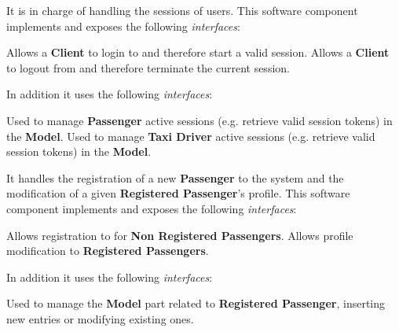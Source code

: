\begin{itemize}
\begin{itemize}
		It is in charge of handling the sessions of \myTaxiService{} users.
		This software component implements and exposes the following \textit{interfaces}:
		\begin{itemize}
			 Allows a \textbf{Client} to login to \myTaxiService{} and therefore start a valid session.
			 Allows a \textbf{Client} to logout from \myTaxiService{} and therefore terminate the current session.
		\end{itemize}
		In addition it uses the following \textit{interfaces}:
		\begin{itemize}
			 Used to manage \textbf{Passenger} active sessions (e.g. retrieve valid session tokens) in the \textbf{Model}.
			 Used to manage \textbf{Taxi Driver} active sessions (e.g. retrieve valid session tokens) in the \textbf{Model}.
		\end{itemize}
		
		\itemBold{Profile Manager}
		It handles the registration of a new \textbf{Passenger} to the system and the modification of a given \textbf{Registered Passenger}'s profile.
		This software component implements and exposes the following \textit{interfaces}:
		\begin{itemize}
			 Allows registration to \myTaxiService{} for \textbf{Non Registered Passengers}.
			 Allows profile modification to \textbf{Registered Passengers}.
		\end{itemize}
		In addition it uses the following \textit{interfaces}:
		\begin{itemize}
			 Used to manage the \textbf{Model} part related to \textbf{Registered Passenger}, inserting new entries or modifying existing ones.
		\end{itemize}


\end{itemize}
\end{itemize}
